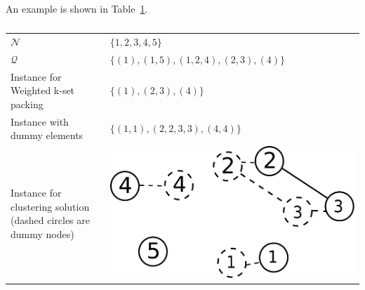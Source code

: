 \documentclass[10pt,journal,compsoc]{IEEEtran}
\makeatletter
\theoremstyle{mytheoremstyle}
\theoremstyle{mytheoremstyle}
\theoremstyle{mytheoremstyle}
\renewenvironment{proof}[1][\proofname]{%
      \par\pushQED{\qed}\fontfamily{ptm}\selectfont%
      \topsep6\p@\@plus6\p@\relax
      \trivlist\item[\hskip\labelsep\bfseries#1\@addpunct{.}]%
      \ignorespaces
    }{%
      \popQED\endtrivlist\@endpefalse
    }
\makeatother
\begin{document}
\begin{proof}
\begin{itemize}
An example is shown in Table~\ref{no_hard_proof_instance}.
\begin{table}[h!]
     \begin{center}
     \begin{tabular}{ p{3cm}  p{4.5cm} }
     \toprule
      $\mathcal{N}$  & $\{1,2,3,4,5\}$\\ 
    \cmidrule(r){1-1}\cmidrule(lr){2-2}     
      $\mathcal{Q}$  & $\{(1),(1, 5),(1,2,4),(2,3), (4)\}$\\ 
    \cmidrule(r){1-1}\cmidrule(lr){2-2}     
      Instance for Weighted k-set packing  & $\{(1),(2,3), (4)\}$\\ 
    \cmidrule(r){1-1}\cmidrule(lr){2-2}
      Instance with dummy elements
      & 
		$\{(1,1),(2,2,3,3), (4,4)\}$
      \\    \cmidrule(r){1-1}\cmidrule(lr){2-2}
	Instance for clustering solution (dashed circles are dummy nodes)
	  &
	  \begin{minipage}{.3\textwidth}
      \includegraphics[width=0.8\linewidth]{np_hard_proof_dummy.pdf}
    \end{minipage}
	  \\       \bottomrule
      \end{tabular}
      \caption{}
      \label{no_hard_proof_instance}
      \end{center}
      \end{table}





\end{itemize}
\end{proof}
\end{document}
